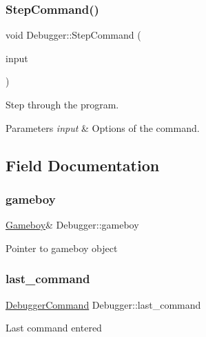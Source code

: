 \subsubsection{\texorpdfstring{Step\+Command()}{StepCommand()}}
{\footnotesize\ttfamily void Debugger\+::\+Step\+Command (\begin{DoxyParamCaption}\item[{\mbox{\hyperlink{structDebuggerCommand}{Debugger\+Command}}}]{input }\end{DoxyParamCaption})\hspace{0.3cm}{\ttfamily [private]}}



Step through the program. 


\begin{DoxyParams}{Parameters}
{\em input} & Options of the command. \\
\hline
\end{DoxyParams}


\subsection{Field Documentation}
\mbox{\label{classDebugger_aecbc0ccbcf7cbd8d36724edd5b5352ea}} 
\subsubsection{\texorpdfstring{gameboy}{gameboy}}
{\footnotesize\ttfamily \mbox{\hyperlink{classGameboy}{Gameboy}}\& Debugger\+::gameboy\hspace{0.3cm}{\ttfamily [private]}}

Pointer to gameboy object \mbox{\label{classDebugger_a115609b27926527f02ba9edcc4290669}} 
\subsubsection{\texorpdfstring{last\+\_\+command}{last\_command}}
{\footnotesize\ttfamily \mbox{\hyperlink{structDebuggerCommand}{Debugger\+Command}} Debugger\+::last\+\_\+command\hspace{0.3cm}{\ttfamily [private]}}

Last command entered \mbox{\label{classDebugger_a3e0c85871a95c23bf1141c2fd86fc798}} 
